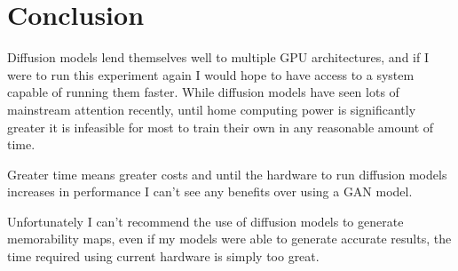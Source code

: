 \documentclass{UoYCSproject}
\begin{document}


\chapter{Conclusion}




Diffusion models lend themselves well to multiple GPU architectures, and if I were to run this experiment again I would hope to have access to a system capable of running them faster. While diffusion models have seen lots of mainstream attention recently, until home computing power is significantly greater it is infeasible for most to train their own in any reasonable amount of time. 

Greater time means greater costs and until the hardware to run diffusion models increases in performance I can't see any benefits over using a GAN model.

Unfortunately I can't recommend the use of diffusion models to generate memorability maps, even if my models were able to generate accurate results, the time required using current hardware is simply too great.
\end{document}
